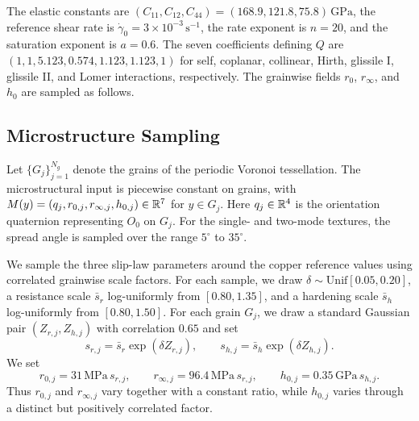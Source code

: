{The elastic constants are $(C_{11},C_{12},C_{44})=(168.9,121.8,75.8)\,\mathrm{GPa}$, the reference shear rate is $\dot\gamma_0=3\times10^{-3}\,\mathrm{s}^{-1}$, the rate exponent is $n=20$, and the saturation exponent is $a=0.6$. The seven coefficients defining $Q$ are $(1,1,5.123,0.574,1.123,1.123,1)$ for self, coplanar, collinear, Hirth, glissile I, glissile II, and Lomer interactions, respectively.} The grainwise fields $r_0$, $r_\infty$, and $h_0$ are sampled as follows.


\subsection{Microstructure Sampling}\label{app:cp3d_microstructure_sampling}
{Let $\{G_j\}_{j=1}^{N_g}$ denote the grains of the periodic Voronoi tessellation. The microstructural input is piecewise constant on grains, with $M(y)=(q_j,r_{0,j},r_{\infty,j},h_{0,j})\in\mathbb{R}^7$ for $y\in G_j$. Here $q_j\in\mathbb{R}^4$ is the orientation quaternion representing $O_0$ on $G_j$. For the single- and two-mode textures, the spread angle is sampled over the range $5^{\circ}$ to $35^{\circ}$.}

{
We sample the three slip-law parameters around the copper reference values using correlated grainwise scale factors. For each sample, we draw $\delta\sim\mathrm{Unif}[0.05,0.20]$, a resistance scale $\bar s_r$ log-uniformly from $[0.80,1.35]$, and a hardening scale $\bar s_h$ log-uniformly from $[0.80,1.50]$. For each grain $G_j$, we draw a standard Gaussian pair $(Z_{r,j},Z_{h,j})$ with correlation $0.65$ and set
\begin{equation*}
    s_{r,j}=\bar s_r\exp(\delta Z_{r,j}),\qquad s_{h,j}=\bar s_h\exp(\delta Z_{h,j}).
\end{equation*}
We set
\begin{equation*}
    r_{0,j}=31\,\mathrm{MPa}\,s_{r,j},\qquad r_{\infty,j}=96.4\,\mathrm{MPa}\,s_{r,j},\qquad h_{0,j}=0.35\,\mathrm{GPa}\,s_{h,j}.
\end{equation*}
Thus $r_{0,j}$ and $r_{\infty,j}$ vary together with a constant ratio, while $h_{0,j}$ varies through a distinct but positively correlated factor.
}

